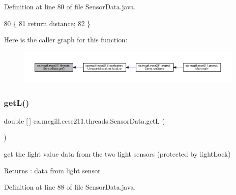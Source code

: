 Definition at line 80 of file Sensor\+Data.\+java.


\begin{DoxyCode}
80                        \{
81     \textcolor{keywordflow}{return} distance;
82   \}
\end{DoxyCode}
Here is the caller graph for this function\+:\nopagebreak
\begin{figure}[H]
\begin{center}
\leavevmode
\includegraphics[width=350pt]{classca_1_1mcgill_1_1ecse211_1_1threads_1_1_sensor_data_a46cc30522719018a80f89624e0ce458f_icgraph}
\end{center}
\end{figure}
\mbox{\label{classca_1_1mcgill_1_1ecse211_1_1threads_1_1_sensor_data_a39eec50582f0e4bcff8a4669c48e1609}} 
\subsubsection{\texorpdfstring{get\+L()}{getL()}}
{\footnotesize\ttfamily double \mbox{[}$\,$\mbox{]} ca.\+mcgill.\+ecse211.\+threads.\+Sensor\+Data.\+getL (\begin{DoxyParamCaption}{ }\end{DoxyParamCaption})}

get the light value data from the two light sensors (protected by light\+Lock) \begin{DoxyReturn}{Returns}
\+: data from light sensor 
\end{DoxyReturn}


Definition at line 88 of file Sensor\+Data.\+java.



